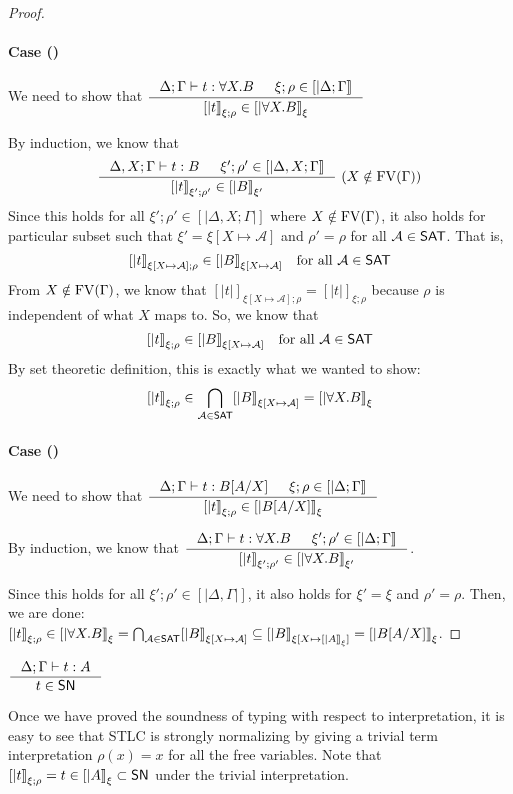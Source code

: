 \begin{proof}
\paragraph{Case ()}
We need to show that
$ \inference{\Delta;\Gamma |- t : \forall X.B & \xi;\rho\in[|\Delta;\Gamma|]}
	{[|t|]_{\xi;\rho} \in [|\forall X.B|]_\xi} $

By induction, we know that
\[ \inference{\Delta,X;\Gamma |- t : B & \xi';\rho'\in[|\Delta,X;\Gamma|]}
	{[|t|]_{\xi';\rho'} \in [|B|]_{\xi'}} ~
	(X\notin\FV(\Gamma))
\]
Since this holds for all $\xi';\rho' \in [|\Delta,X;\Gamma|]$ where
$X\notin\mathop{\mathrm{FV}}(\Gamma)$, it also holds for particular subset such that
$\xi' = \xi[X\mapsto\mathcal{A}]$ and $\rho'=\rho$ for all $\mathcal{A}\in\mathsf{SAT}$.
That is,
\[ [|t|]_{\xi[X\mapsto\mathcal{A}];\rho} \in [|B|]_{\xi[X\mapsto\mathcal{A}]}
   \quad \text{for all}~\mathcal{A}\in\mathsf{SAT} \]
From $X\notin\mathop{\mathrm{FV}}(\Gamma)$, we know that
$[|t|]_{\xi[X\mapsto\mathcal{A}];\rho} = [|t|]_{\xi;\rho}$
because $\rho$ is independent of what $X$ maps to.
So, we know that
\[ [|t|]_{\xi;\rho} \in [|B|]_{\xi[X\mapsto\mathcal{A}]}
	\quad \text{for all}~\mathcal{A}\in\mathsf{SAT} \]
By set theoretic definition, this is exactly what we wanted to show:
\[ [|t|]_{\xi;\rho} \in
	\bigcap_{\mathcal{A}\in\mathsf{SAT}} [|B|]_{\xi[X\mapsto\mathcal{A}]}
	= [|\forall X.B|]_\xi
\]

\paragraph{Case ()}
We need to show that
$ \inference{\Delta;\Gamma |- t : B[A/X] & \xi;\rho\in[|\Delta;\Gamma|]}
	{[|t|]_{\xi;\rho} \in [|B[A/X]|]_\xi} $

By induction, we know that
$ \inference{\Delta;\Gamma |- t : \forall X.B & \xi';\rho'\in[|\Delta;\Gamma|]}
	{[|t|]_{\xi';\rho'} \in [|\forall X.B|]_{\xi'}}
$.

Since this holds for all $\xi';\rho' \in [|\Delta,\Gamma|]$,
it also holds for $\xi'=\xi$ and $\rho'=\rho$. Then, we are done:
$ [|t|]_{\xi;\rho} \in [|\forall X.B|]_{\xi}
	= \bigcap_{\mathcal{A}\in\mathsf{SAT}} [|B|]_{\xi[X\mapsto\mathcal{A}]}
	\subseteq [|B|]_{\xi[X\mapsto[|A|]_\xi]} = [|B[A/X]|]_\xi
$.
\end{proof}
\begin{corollary}
	$\inference{\Delta;\Gamma |- t : A}{t \in \SN}$
\end{corollary}
Once we have proved the soundness of typing with respect to interpretation,
it is easy to see that STLC is strongly normalizing by giving a trivial term
interpretation $\rho(x) = x$ for all the free variables.
Note that $[|t|]_{\xi;\rho} = t \in [|A|]_\xi \subset \mathsf{SN}$
under the trivial interpretation.

